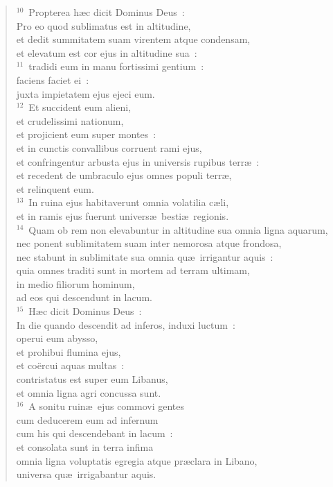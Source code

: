 \begin{flushleft}\begin{verse}${}^{10}$~Propterea h\ae c dicit Dominus Deus~:\\ Pro eo quod sublimatus est in altitudine,\\ et dedit summitatem suam virentem atque condensam,\\ et elevatum est cor ejus in altitudine sua~:\\
${}^{11}$~tradidi eum in manu fortissimi gentium~:\\ faciens faciet ei~:\\ juxta impietatem ejus ejeci eum.\\
${}^{12}$~Et succident eum alieni,\\ et crudelissimi nationum,\\ et projicient eum super montes~:\\ et in cunctis convallibus corruent rami ejus,\\ et confringentur arbusta ejus in universis rupibus terr\ae~:\\ et recedent de umbraculo ejus omnes populi terr\ae ,\\ et relinquent eum.\\
${}^{13}$~In ruina ejus habitaverunt omnia volatilia c\ae li,\\ et in ramis ejus fuerunt univers\ae\ besti\ae\ regionis.\\
${}^{14}$~Quam ob rem non elevabuntur in altitudine sua omnia ligna aquarum,\\ nec ponent sublimitatem suam inter nemorosa atque frondosa,\\ nec stabunt in sublimitate sua omnia qu\ae\ irrigantur aquis~:\\ quia omnes traditi sunt in mortem ad terram ultimam,\\ in medio filiorum hominum,\\ ad eos qui descendunt in lacum.\\
${}^{15}$~H\ae c dicit Dominus Deus~:\\ In die quando descendit ad inferos, induxi luctum~:\\ operui eum abysso,\\ et prohibui flumina ejus,\\ et co\"ercui aquas multas~:\\ contristatus est super eum Libanus,\\ et omnia ligna agri concussa sunt.\\
${}^{16}$~A sonitu ruin\ae\ ejus commovi gentes\\ cum deducerem eum ad infernum\\ cum his qui descendebant in lacum~:\\ et consolata sunt in terra infima\\ omnia ligna voluptatis egregia atque pr\ae clara in Libano,\\ universa qu\ae\ irrigabantur aquis.\\

\end{verse}
\end{flushleft}
